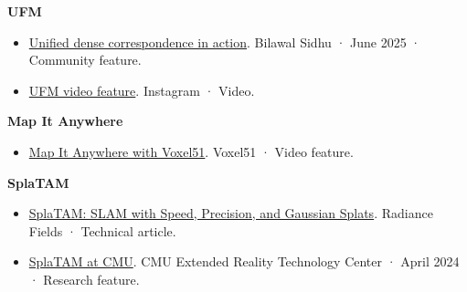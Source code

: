 \begin{cventry}
\textbf{UFM}\par
\begin{itemize}[topsep=2pt]\small
  \item \href{https://x.com/bilawalsidhu/status/1932975764992868427}{Unified dense correspondence in action}. Bilawal Sidhu · June 2025 · Community feature.
  \item \href{https://www.instagram.com/reel/DKz06cqRGEi/}{UFM video feature}. Instagram · Video.
\end{itemize}
\end{cventry}

\begin{cventry}
\textbf{Map It Anywhere}\par
\begin{itemize}[topsep=2pt]\small
  \item \href{https://youtu.be/XRHEFbCWo48}{Map It Anywhere with Voxel51}. Voxel51 · Video feature.
\end{itemize}
\end{cventry}

\begin{cventry}
\textbf{SplaTAM}\par
\begin{itemize}[topsep=2pt]\small
  \item \href{https://radiancefields.com/splatam-slam-with-speed-precision-and-gaussian-splats}{SplaTAM: SLAM with Speed, Precision, and Gaussian Splats}. Radiance Fields · Technical article.
  \item \href{https://www.cmu.edu/xrtc/news/2024/april/splatam.html}{SplaTAM at CMU}. CMU Extended Reality Technology Center · April 2024 · Research feature.
\end{itemize}
\end{cventry}
